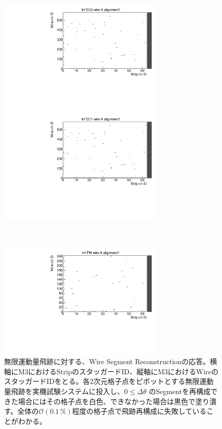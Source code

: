 \begin{figure}
    \begin{minipage}[b]{.5\linewidth}
        \centering
        \includegraphics[height=5.6cm]{fig/Test/A_InfEC0_wire.pdf}
    \end{minipage}
    \begin{minipage}[b]{.5\linewidth}
        \centering
        \includegraphics[height=5.6cm]{fig/Test/A_InfEC1_wire.pdf}
    \end{minipage}\\
    \begin{minipage}[b]{\linewidth}
        \centering
        \includegraphics[height=5.6cm]{fig/Test/A_InfFW_wire.pdf}
    \end{minipage}
    \caption[無限運動量飛跡に対する、Wire Segment Reconstructionの応答]{無限運動量飛跡に対する、Wire Segment Reconstructionの応答。横軸にM3におけるStripのスタッガードID、縦軸にM3におけるWireのスタッガードIDをとる。各2次元格子点をピボットとする無限運動量飛跡を実機試験システムに投入し、$0 \leq \Delta\theta$ のSegmentを再構成できた場合にはその格子点を白色、できなかった場合は黒色で塗り潰す。全体の$\mathcal{O}(0.1\,\%)$程度の格子点で飛跡再構成に失敗していることがわかる。}
    \label{Inf_A_Wire}
\end{figure}



